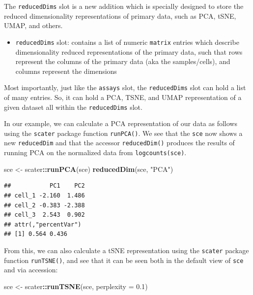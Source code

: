 \documentclass[]{book}
\newenvironment{Shaded}{\begin{snugshade}}{\end{snugshade}}
\newcommand{\DataTypeTok}[1]{\textcolor[rgb]{0.13,0.29,0.53}{#1}}
\newcommand{\FloatTok}[1]{\textcolor[rgb]{0.00,0.00,0.81}{#1}}
\newcommand{\KeywordTok}[1]{\textcolor[rgb]{0.13,0.29,0.53}{\textbf{#1}}}
\newcommand{\NormalTok}[1]{#1}
\newcommand{\OperatorTok}[1]{\textcolor[rgb]{0.81,0.36,0.00}{\textbf{#1}}}
\newcommand{\StringTok}[1]{\textcolor[rgb]{0.31,0.60,0.02}{#1}}
\providecommand{\tightlist}{%
  \setlength{\itemsep}{0pt}\setlength{\parskip}{0pt}}
\begin{document}
The \texttt{reducedDims} slot is a new addition which is specially designed to store the reduced dimensionality representations of primary data, such as PCA, tSNE, UMAP, and others.

\begin{itemize}
\tightlist
\item
  \texttt{reducedDims} slot: contains a list of numeric \texttt{matrix} entries which describe dimensionality reduced representations of the primary data, such that rows represent the columns of the primary data (aka the samples/cells), and columns represent the dimensions
\end{itemize}

Most importantly, just like the \texttt{assays} slot, the \texttt{reducedDims} slot can hold a list of many entries. So, it can hold a PCA, TSNE, and UMAP representation of a given dataset all within the \texttt{reducedDims} slot.

In our example, we can calculate a PCA representation of our data as follows using the \texttt{scater} package function \texttt{runPCA()}. We see that the \texttt{sce} now shows a new \texttt{reducedDim} and that the accessor \texttt{reducedDim()} produces the results of running PCA on the normalized data from \texttt{logcounts(sce)}.

\begin{Shaded}
\begin{Highlighting}[]
\NormalTok{sce <-}\StringTok{ }\NormalTok{scater}\OperatorTok{::}\KeywordTok{runPCA}\NormalTok{(sce)}
\KeywordTok{reducedDim}\NormalTok{(sce, }\StringTok{"PCA"}\NormalTok{)}
\end{Highlighting}
\end{Shaded}

\begin{verbatim}
##           PC1    PC2
## cell_1 -2.160  1.486
## cell_2 -0.383 -2.388
## cell_3  2.543  0.902
## attr(,"percentVar")
## [1] 0.564 0.436
\end{verbatim}

From this, we can also calculate a tSNE representation using the \texttt{scater} package function \texttt{runTSNE()}, and see that it can be seen both in the default view of \texttt{sce} and via accession:

\begin{Shaded}
\begin{Highlighting}[]
\NormalTok{sce <-}\StringTok{ }\NormalTok{scater}\OperatorTok{::}\KeywordTok{runTSNE}\NormalTok{(sce, }\DataTypeTok{perplexity =} \FloatTok{0.1}\NormalTok{)}
\end{Highlighting}
\end{Shaded}
\end{document}

